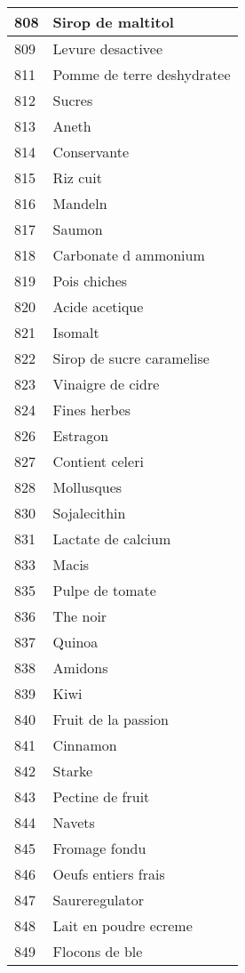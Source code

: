 \begin{longtable}{|l|l|}
808 & Sirop de maltitol \\ \hline 
809 & Levure desactivee \\ \hline 
811 & Pomme de terre deshydratee \\ \hline 
812 & Sucres \\ \hline 
813 & Aneth \\ \hline 
814 & Conservante \\ \hline 
815 & Riz cuit \\ \hline 
816 & Mandeln \\ \hline 
817 & Saumon \\ \hline 
818 & Carbonate d ammonium \\ \hline 
819 & Pois chiches \\ \hline 
820 & Acide acetique \\ \hline 
821 & Isomalt \\ \hline 
822 & Sirop de sucre caramelise \\ \hline 
823 & Vinaigre de cidre \\ \hline 
824 & Fines herbes \\ \hline 
826 & Estragon \\ \hline 
827 & Contient celeri \\ \hline 
828 & Mollusques \\ \hline 
830 & Sojalecithin \\ \hline 
831 & Lactate de calcium \\ \hline 
833 & Macis \\ \hline 
835 & Pulpe de tomate \\ \hline 
836 & The noir \\ \hline 
837 & Quinoa \\ \hline 
838 & Amidons \\ \hline 
839 & Kiwi \\ \hline 
840 & Fruit de la passion \\ \hline 
841 & Cinnamon \\ \hline 
842 & Starke \\ \hline 
843 & Pectine de fruit \\ \hline 
844 & Navets \\ \hline 
845 & Fromage fondu \\ \hline 
846 & Oeufs entiers frais \\ \hline 
847 & Saureregulator \\ \hline 
848 & Lait en poudre ecreme \\ \hline 
849 & Flocons de ble \\ \hline 

\end{longtable}
